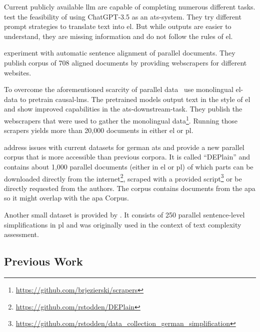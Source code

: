 Current publicly available \gls{llm} are capable of completing numerous different tasks.
\textcite{deilen2023using} test the feasibility of using ChatGPT-3.5 as an \gls{ats}-system.
They try different prompt strategies to translate text into \gls{el}.
But while outputs are easier to understand, they are missing information and do not follow the rules of \gls{el}.

\textcite{toborek2023new} experiment with automatic sentence alignment of parallel documents.
They publish corpus of 708 aligned documents by providing \gls{webscraper}s for different websites.

To overcome the aforementioned scarcity of parallel data~\textcite{Ansch_tz_2023} use monolingual \gls{el}-data to pretrain \gls{causal-lm}s.
The pretrained models output text in the style of \gls{el} and show improved capabilities in the \gls{ats}-downstream-task.
They publish the \gls{webscraper}s that were used to gather the monolingual data\footnote{\url{https://github.com/brjezierski/scrapers}}.
Running those scrapers yields more than 20,000 documents in either \gls{el} or \gls{pl}.

\textcite{stodden-etal-2023-deplain} address issues with current datasets for german \gls{ats} and provide a new parallel corpus that is more accessible than previous corpora.
It is called \enquote{DEPlain} and contains about 1,000 parallel documents (either in \gls{el} or \gls{pl}) of which parts can be downloaded directly from the internet\footnote{\url{https://github.com/rstodden/DEPlain}}, scraped with a provided script\footnote{\url{https://github.com/rstodden/data_collection_german_simplification}} or be directly requested from the authors.
The corpus contains documents from the \gls{apa} so it might overlap with the \gls{apa} Corpus.

Another small dataset is provided by \textcite{naderi2019subjective}.
It consists of 250 parallel sentence-level simplifications in \gls{pl} and was originally used in the context of text complexity assessment.


\subsection{Previous Work}\label{subsec:previous-work}

